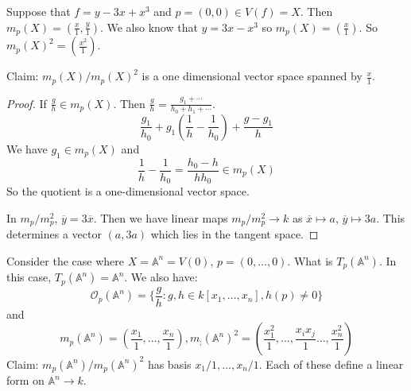 \documentclass{report}
\begin{document}
\begin{examples}
    \begin{example}
        Suppose that $f = y - 3x + x^{3}$ and $p = (0, 0) \in V(f) = X$. Then $m_{p}(X) = (\frac{x}{1}, \frac{y}{1})$. We also know that $y= 3x - x^{3}$ so $m_{p}(X) = (\frac{x}{1})$. So $m_{p}(X)^{2} = (\frac{x^{2}}{1})$. 

        Claim: $m_{p}(X)/m_{p}(X)^{2}$ is a one dimensional vector space spanned by $\frac{x}{1}$. 
            \begin{proof}
                If $\frac{g}{h} \in m_{p}(X)$. Then $\frac{g}{h} = \frac{g_{1} + \cdots }{h_{0} + h_{1} + \cdots }$. 
                    \begin{equation*}
                        \dfrac{g_{1}}{h_{0}} + g_{1}\left(\dfrac{1}{h} - \dfrac{1}{h_{0}}\right) + \dfrac{g - g_{1}}{h}
                    \end{equation*}
                We have $g_{1} \in m_{p}(X)$ and 
                    \begin{equation*}
                        \dfrac{1}{h} - \dfrac{1}{h_{0}} = \dfrac{h_{0} - h}{hh_{0}} \in m_{p}(X)
                    \end{equation*}
                So the quotient is a one-dimensional vector space.

                In $m_{p}/m_{p}^{2}$, $\overline{y} = 3\overline{x}$. Then we have linear maps $m_{p}/m_{p}^{2} \rightarrow k$  as $\overline{x} \mapsto a$, $\overline{y} \mapsto 3a$. This determines a vector $(a, 3a)$ which lies in the tangent space.
            \end{proof}
    \end{example}
\end{examples}

Consider the case where $X = \mathbb{A}^{n} = V(0)$, $p = (0, \ldots , 0)$. What is $T_{p}(\mathbb{A}^{n})$. In this case, $T_{p}(\mathbb{A}^{n}) = \mathbb{A}^{n}$. We also have:
    \begin{equation*}
        \mathcal{O}_{p}(\mathbb{A}^{n}) = \{\dfrac{g}{h} : g, h \in k[x_{1}, \ldots , x_{n}], h(p) \neq 0\}
    \end{equation*}
and
    \begin{equation*}
        m_{p}(\mathbb{A}^{n}) = (\dfrac{x_{1}}{1}, \ldots , \dfrac{x_{n}}{1}), m_{;}(\mathbb{A}^{n})^{2} = \left(\dfrac{x_{1}^{2}}{1}, \ldots , \dfrac{x_{i}x_{j}}{1}\ldots , \dfrac{x_{n}^{2}}{1}\right)
    \end{equation*}
Claim: $m_{p}(\mathbb{A}^{n})/m_{p}(\mathbb{A}^{n})^{2}$ has basis $x_{1}/1, \ldots , x_{n}/1$. Each of these define a linear form on $\mathbb{A}^{n} \rightarrow k$. 
\end{document}
